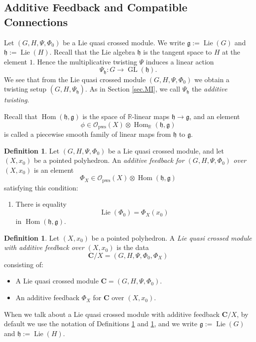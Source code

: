 \documentclass[10pt, a4paper]{amsart}
\theoremstyle{definition}
\newtheorem{dfn}[equation]{Definition}
\numberwithin{equation}{section}
\newcommand{\opn}{\operatorname}
\newcommand{\rmitem}[1]{\item[\text{\textup{(#1)}}]}
\newcommand{\mfrak}[1]{\mathfrak{#1}}
\newcommand{\mcal}[1]{\mathcal{#1}}
\newcommand{\mbf}[1]{\mathbf{#1}}
\newcommand{\mrm}[1]{\mathrm{#1}}
\newcommand{\mbb}[1]{\mathbb{#1}}
\newcommand{\R}{\mbb{R}}
\newcommand{\g}{\mfrak{g}}
\newcommand{\h}{\mfrak{h}}
\begin{document}
\subsection{Additive Feedback and Compatible Connections}
Let $(G, H, \Psi, \Phi_0)$ be a Lie quasi crossed module. 
We write $\g := \opn{Lie}(G)$ and $\h := \opn{Lie}(H)$.
Recall that the Lie algebra $\h$ is the tangent space to $H$ at the element
$1$. Hence the multiplicative twisting $\Psi$ induces a linear action 
\[ \Psi_{\h} : G \to \opn{GL}(\h) . \]
We see that from the Lie quasi crossed module 
$(G, H, \Psi, \Phi_0)$
we obtain a twisting setup 
$(G, H, \Psi_{\h})$. As in Section \ref{sec.MI}, we call 
$\Psi_{\h}$ the {\em additive twisting}. 

Recall that $\opn{Hom}(\h, \g)$ is the space of $\R$-linear maps
$\h \to \g$, and an element 
\[ \phi \in \mcal{O}_{\mrm{pws}}(X) \otimes \opn{Hom}_{\R}(\h, \g) \]
is called a piecewise smooth family of linear maps from $\h$ to $\g$.

\begin{dfn} \label{dfn:21}
Let $(G, H, \Psi, \Phi_0)$ be a Lie quasi crossed module, and let
$(X, x_0)$ be a pointed polyhedron. 
An {\em additive feedback  for $(G, H, \Psi, \Phi_0)$ over $(X, x_0)$}
is an element
\[ \Phi_X \in \mcal{O}_{\mrm{pws}}(X) \otimes \opn{Hom}(\h, \g)  \]
satisfying this condition:
\begin{enumerate}
\rmitem{$**$} There is equality 
\[ \opn{Lie}(\Phi_0) = \Phi_X(x_0) \]
in $\opn{Hom}(\h, \g)$.
\end{enumerate}
\end{dfn}

\begin{dfn} \label{dfn:6}
Let $(X, x_0)$ be a pointed polyhedron. 
A {\em Lie quasi crossed module with additive feedback over $(X, x_0)$}
is the data 
\[  \mbf{C} / X = (G, H, \Psi, \Phi_0, \Phi_X) \]
consisting of:
\begin{itemize}
\item A Lie quasi crossed module 
$\mbf{C} = (G, H, \Psi, \Phi_0)$. 
%
\item An additive feedback $\Phi_X$ for $\mbf{C}$ over $(X, x_0)$.
\end{itemize}
\end{dfn}

When we talk about a Lie quasi crossed module with additive feedback 
$\mbf{C} / X$, by default we use the notation of Definitions \ref{dfn:21} and
\ref{dfn:6}, and we write
$\g := \opn{Lie}(G)$ and $\h := \opn{Lie}(H)$.
\end{document}
